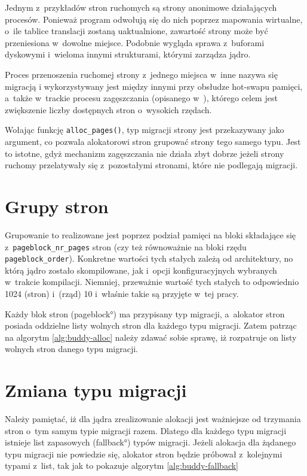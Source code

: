 Jednym z~przykładów stron ruchomych są strony anonimowe działających
procesów.  Ponieważ program odwołują się do nich poprzez mapowania
wirtualne, o~ile tablice translacji zostaną uaktualnione, zawartość
strony może być przeniesiona w~dowolne miejsce.  Podobnie wygląda
sprawa z~buforami dyskowymi i~wieloma innymi strukturami, którymi
zarządza jądro.

Proces przenoszenia ruchomej strony z~jednego miejsca w~inne nazywa
się migracją i wykorzystywany jest między innymi przy obsłudze
hot-swapu pamięci, a~także w~trackie procesu zagęszczania (opisanego
w~\cite{bib:compaction}), którego celem jest zwiększenie liczby
dostępnych stron o~wysokich rzędach.

Wołając funkcję \lstinline|alloc_pages()|, typ migracji strony jest
przekazywany jako argument, co pozwala alokatorowi stron grupować
strony tego samego typu.  Jest to istotne, gdyż mechanizm zagęszczania
nie działa zbyt dobrze jeżeli strony ruchomy przelatywały się
z~pozostałymi stronami, które nie podlegają migracji.

\section{Grupy stron}

Grupowanie to realizowane jest poprzez podział pamięci na bloki
składające się z~\lstinline|pageblock_nr_pages| stron (czy też
równoważnie na bloki rzędu \lstinline|pageblock_order|).  Konkretne
wartości tych stałych zależą od architektury, no którą jądro zostało
skompilowane, jak i~opcji konfiguracyjnych wybranych w~trakcie
kompilacji.  Niemniej, przeważnie wartość tych stałych to odpowiednio
1024 (stron) i~(rząd) 10 i~właśnie takie są przyjęte w~tej pracy.

Każdy blok stron (\ang{pageblock}) ma przypisany typ migracji,
a~alokator stron posiada oddzielne listy wolnych stron dla każdego
typu migracji.  Zatem patrząc na algorytm \ref{alg:buddy-alloc} należy
zdawać sobie sprawę, iż rozpatruje on listy wolnych stron danego typu
migracji.

\section{Zmiana typu migracji}\label{sec:type-change}

Należy pamiętać, iż dla jądra zrealizowanie alokacji jest ważniejsze
od trzymania stron o~tym samym typie migracji razem.  Dlatego dla
każdego typu migracji istnieje list zapasowych (\ang{fallback}) typów
migracji.  Jeżeli alokacja dla żądanego typu migracji nie powiedzie
się, alokator stron będzie próbował z~kolejnymi typami z~list, tak jak
to pokazuje algorytm \ref{alg:buddy-fallback}

